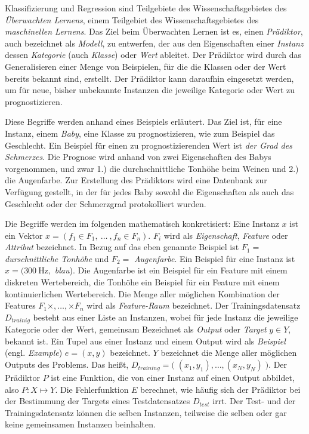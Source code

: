 Klassifizierung und Regression sind Teilgebiete des Wissenschaftsgebietes des \emph{Überwachten Lernens}, einem Teilgebiet des Wissenschaftsgebietes des \emph{maschinellen Lernens}. Das Ziel beim Überwachten Lernen ist es, einen \emph{Prädiktor}, auch bezeichnet als \emph{Modell}, zu entwerfen, der aus den Eigenschaften einer \emph{Instanz} dessen \emph{Kategorie} (auch \emph{Klasse}) oder \emph{Wert} ableitet. Der Prädiktor wird durch das Generalisieren einer Menge von Beispielen, für die die Klassen oder der Wert bereits bekannt sind, erstellt. Der Prädiktor kann daraufhin eingesetzt werden, um für neue, bisher unbekannte Instanzen die jeweilige Kategorie oder Wert zu prognostizieren.\cite[S. 6 - 7]{machine_marsland}

Diese Begriffe werden anhand eines Beispiels erläutert. Das Ziel ist, für eine Instanz, einem \emph{Baby}, eine Klasse zu prognostizieren, wie zum Beispiel das Geschlecht. Ein Beispiel für einen zu prognostizierenden Wert ist \emph{der Grad des Schmerzes}. Die Prognose wird anhand von zwei Eigenschaften des Babys vorgenommen, und zwar 1.) die durchschnittliche Tonhöhe beim Weinen und 2.) die Augenfarbe. Zur Erstellung des Prädiktors wird eine Datenbank zur Verfügung gestellt, in der für jedes Baby sowohl die Eigenschaften als auch das Geschlecht oder der Schmerzgrad protokolliert wurden.

Die Begriffe werden im folgenden mathematisch konkretisiert: Eine Instanz $x$ ist ein Vektor $x = ( f_1 \in F_1 ,\ \ldots\ , f_n \in F_n )$. $F_i$ wird als \emph{Eigenschaft}, \emph{Feature} oder \emph{Attribut} bezeichnet. In Bezug auf das eben genannte Beispiel ist $F_1 = $ \emph{durschnittliche Tonhöhe} und $F_2 = $ \emph{Augenfarbe}. Ein Beispiel für eine Instanz ist $x = ( \SI{300}{\hertz},$ \emph{blau}). Die Augenfarbe ist ein Beispiel für ein Feature mit einem diskreten Wertebereich, die Tonhöhe ein Beispiel für ein Feature mit einem kontinuierlichen Wertebereich. Die Menge aller möglichen Kombination der Features $F_1 \times , \ldots , \times F_n$ wird als \emph{Feature-Raum} bezeichnet. Der Trainingsdatensatz $D_{trainig}$ besteht aus einer Liste an Instanzen, wobei für jede Instanz die jeweilige Kategorie oder der Wert, gemeinsam Bezeichnet als \emph{Output} oder \emph{Target} $y \in Y$, bekannt ist. Ein Tupel aus einer Instanz und einem Output wird als \emph{Beispiel} (engl. \emph{Example}) $e =(x,y)$ bezeichnet. $Y$ bezeichnet die Menge aller möglichen Outputs des Problems. Das heißt, $D_{training} = \big( \; (x_1, y_1), \ldots , (x_N, y_N) \; \big)$. Der Prädiktor $P$ ist eine Funktion, die von einer Instanz auf einen Output abbildet, also $P: X \mapsto Y$. Die Fehlerfunktion $E$ berechnet, wie häufig sich der Prädiktor bei der Bestimmung der Targets eines Testdatensatzes $D_{test}$ irrt. Der Test- und der Trainingsdatensatz können die selben Instanzen, teilweise die selben oder gar keine gemeinsamen Instanzen beinhalten.\cite[S. 6 - 7, 18 - 19]{machine_marsland} \cite[S. 8 - 9]{learning_cart_dobra} 


